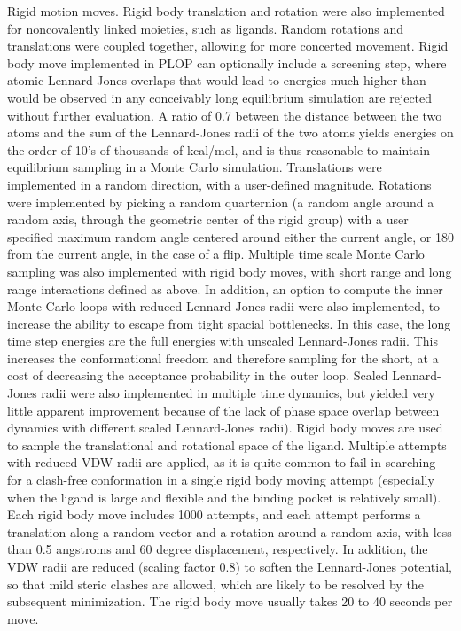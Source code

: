Rigid motion moves.
Rigid body translation and rotation were also implemented for noncovalently linked moieties, such as ligands.
Random rotations and translations were coupled together, allowing for more concerted movement.
Rigid body move implemented in PLOP can optionally include a screening step, where atomic Lennard-Jones overlaps that would lead to energies much higher than would be observed in any conceivably long equilibrium simulation are rejected without further evaluation.
A ratio of 0.7 between the distance between the two atoms and the sum of the Lennard-Jones radii of the two atoms yields energies on the order of 10's of thousands of kcal/mol, and is thus reasonable to maintain equilibrium sampling in a Monte Carlo simulation.
Translations were implemented in a random direction, with a user-defined magnitude.
Rotations were implemented by picking a random quarternion (a random angle around a random axis, through the geometric center of the rigid group) with a user specified maximum random angle centered around either the current angle, or 180 from the current angle, in the case of a flip.
Multiple time scale Monte Carlo sampling was also implemented with rigid body moves, with short range and long range interactions defined as above.
In addition, an option to compute the inner Monte Carlo loops with reduced Lennard-Jones radii were also implemented, to increase the ability to escape from tight spacial bottlenecks.
In this case, the long time step energies are the full energies with unscaled Lennard-Jones radii.
This increases the conformational freedom and therefore sampling for the short, at a cost of decreasing the acceptance probability in the outer loop.
Scaled Lennard-Jones radii were also implemented in multiple time dynamics, but yielded very little apparent improvement because of the lack of phase space overlap between dynamics with different scaled Lennard-Jones radii).
Rigid body moves are used to sample the translational and rotational space of the ligand.
Multiple attempts with reduced VDW radii are applied, as it is quite common to fail in searching for a clash-free conformation in a single rigid body moving attempt (especially when the ligand is large and flexible and the binding pocket is relatively small).
Each rigid body move includes 1000 attempts, and each attempt performs a translation along a random vector and a rotation around a random axis, with less than 0.5 angstroms and 60 degree displacement, respectively.
In addition, the VDW radii are reduced (scaling factor 0.8) to soften the Lennard-Jones potential, so that mild steric clashes are allowed, which are likely to be resolved by the subsequent minimization.
The rigid body move usually takes 20 to 40 seconds per move.

